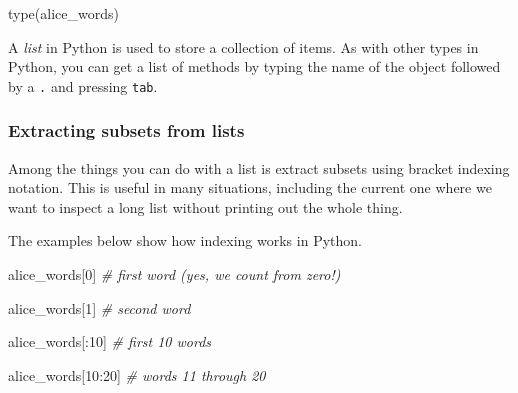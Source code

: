 \documentclass[]{book}
\newenvironment{Shaded}{\begin{snugshade}}{\end{snugshade}}
\newcommand{\DecValTok}[1]{\textcolor[rgb]{0.00,0.00,0.81}{#1}}
\newcommand{\CommentTok}[1]{\textcolor[rgb]{0.56,0.35,0.01}{\textit{#1}}}
\newcommand{\BuiltInTok}[1]{#1}
\newcommand{\NormalTok}[1]{#1}
\begin{document}
\begin{Shaded}
\begin{Highlighting}[]
\BuiltInTok{type}\NormalTok{(alice_words)}
\end{Highlighting}
\end{Shaded}

A \emph{list} in Python is used to store a collection of items. As with
other types in Python, you can get a list of methods by typing the name
of the object followed by a \texttt{.} and pressing \texttt{tab}.

\subsubsection{Extracting subsets from
lists}\label{extracting-subsets-from-lists}

Among the things you can do with a list is extract subsets using bracket
indexing notation. This is useful in many situations, including the
current one where we want to inspect a long list without printing out
the whole thing.

The examples below show how indexing works in Python.

\begin{Shaded}
\begin{Highlighting}[]
\NormalTok{alice_words[}\DecValTok{0}\NormalTok{] }\CommentTok{# first word (yes, we count from zero!)}
\end{Highlighting}
\end{Shaded}

\begin{Shaded}
\begin{Highlighting}[]
\NormalTok{alice_words[}\DecValTok{1}\NormalTok{] }\CommentTok{# second word}
\end{Highlighting}
\end{Shaded}

\begin{Shaded}
\begin{Highlighting}[]
\NormalTok{alice_words[:}\DecValTok{10}\NormalTok{] }\CommentTok{# first 10 words}
\end{Highlighting}
\end{Shaded}

\begin{Shaded}
\begin{Highlighting}[]
\NormalTok{alice_words[}\DecValTok{10}\NormalTok{:}\DecValTok{20}\NormalTok{] }\CommentTok{# words 11 through 20}
\end{Highlighting}
\end{Shaded}
\end{document}
